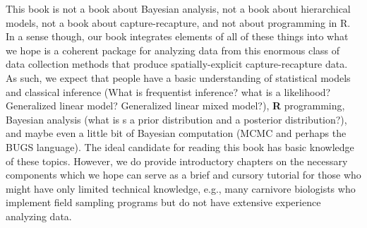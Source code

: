 This book is not a book about Bayesian analysis, not a book about
hierarchical models, not a book about capture-recapture, and not about
programming in R. In a sense though, our book integrates elements of
all of these things into what we hope is a coherent package for
analyzing data from this enormous class of data collection methods
that produce spatially-explicit capture-recapture data.   As such, we
expect that people have a basic understanding of statistical models
and classical inference (What is frequentist inference? what is a
likelihood? Generalized linear model? Generalized linear mixed
model?),
{\bf R} programming,
 Bayesian analysis (what is s a prior distribution and a
posterior distribution?),
and maybe even a little bit
of Bayesian
computation (MCMC and perhaps the BUGS language).
The ideal candidate for reading this book has basic knowledge of these
topics. However, we do provide introductory chapters on the necessary
components which we hope can serve as a brief and cursory tutorial for
those who might have only limited technical knowledge, e.g., many
carnivore biologists who implement field sampling programs but do not
have extensive experience analyzing data.

